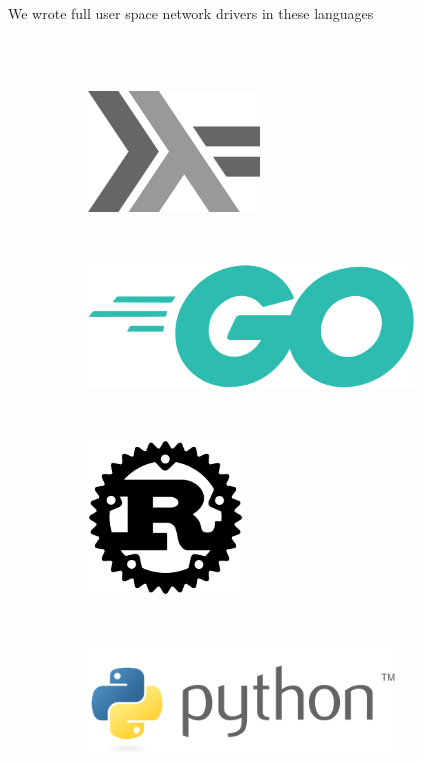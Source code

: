 \documentclass[NET,english,aspectratio=169,notitleframe]{tumbeamer}
\begin{document}
\begin{frame}{We wrote full user space network drivers in these languages}
\begin{figure}
\begin{subfigure}[t]{0.2\textwidth}
    \end{subfigure}
    \\
    \vspace{2.5em}
    \centering
    ~ 
    \begin{subfigure}[t]{0.2\columnwidth}
        \centering
        \includegraphics[width=0.5\textwidth]{pics/haskell}
    \end{subfigure}
    ~ 
    \begin{subfigure}[t]{0.2\columnwidth}
        \centering
        \includegraphics[width=0.95\textwidth]{pics/go}
    \end{subfigure}
    ~ 
    \begin{subfigure}[t]{0.2\columnwidth}
        \centering
        \includegraphics[width=0.45\textwidth]{pics/rust}
    \end{subfigure}
    ~ 
    \begin{subfigure}[t]{0.3\columnwidth}
	\centering
        \includegraphics[width=0.9\textwidth]{pics/python}
    \end{subfigure}
\end{figure}
\end{frame}
\end{document}
